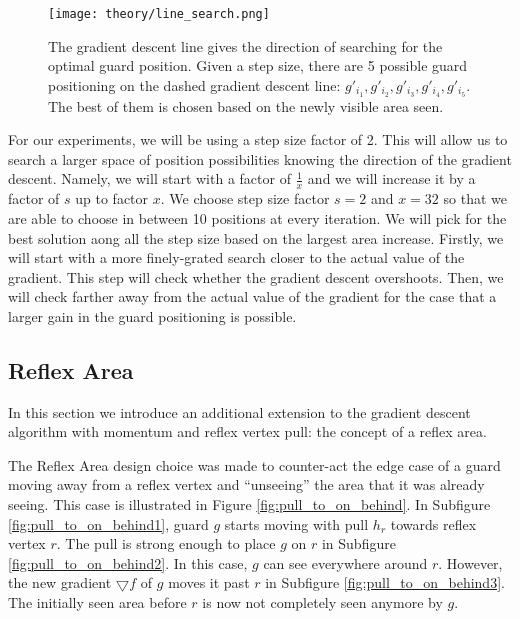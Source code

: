 \begin{figure}[h!]
    \centering
    \texttt{[image: theory/line\_search.png]}
    \caption{The gradient descent line gives the direction of searching for the optimal guard position. Given a step size, there are 5 possible guard positioning on the dashed gradient descent line: $g'_{i_1}, g'_{i_2}, g'_{i_3}, g'_{i_4}, g'_{i_5}$. The best of them is chosen based on the newly visible area seen.}
    \label{fig:line}
\end{figure}

For our experiments, we will be using a step size factor of 2. This will allow us to search a larger space of position possibilities knowing the direction of the gradient descent. 
Namely, we will start with a factor of $\frac 1 x$ and we will increase it by a factor of $s$ up to factor $x$. We choose step size factor $s = 2$ and $x = 32$ so that we are able to choose in between 10 positions at every iteration. We will pick for the best solution aong all the step size based on the largest area increase. Firstly, we will start with a more finely-grated search closer to the actual value of the gradient. This step will check whether the gradient descent overshoots. Then, we will check farther away from the actual value of the gradient for the case that a larger gain in the guard positioning is possible.

\subsection{Reflex Area}
In this section we introduce an additional extension to the gradient descent algorithm with momentum and reflex vertex pull: the concept of a reflex area. 

The Reflex Area design choice was made to counter-act the edge case of a guard moving away from a reflex vertex and ``unseeing'' the area that it was already seeing. This case is illustrated in Figure \ref{fig:pull_to_on_behind}. In Subfigure \ref{fig:pull_to_on_behind1}, guard $g$ starts moving with pull $h_r$ towards reflex vertex $r$. The pull is strong enough to place $g$ on $r$ in Subfigure \ref{fig:pull_to_on_behind2}. In this case, $g$ can see everywhere around $r$. However, the new gradient $\bigtriangledown f$ of $g$ moves it past $r$ in Subfigure \ref{fig:pull_to_on_behind3}. The initially seen area before $r$ is now not completely seen anymore by $g$.

